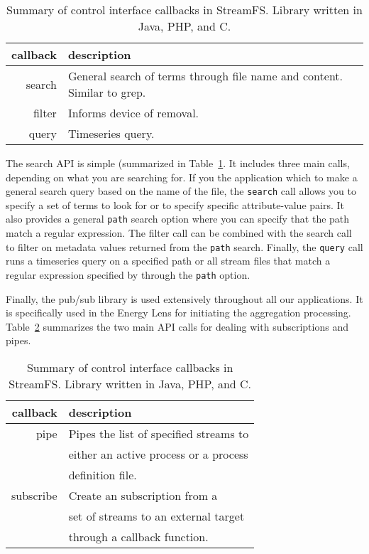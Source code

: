 \begin{table}[h]
\begin{center}
\begin{tabular}{| r | l |}
	\hline
	\textbf{callback} & \textbf{description} \\ \hline
	search & General search of terms through file name and content.  Similar to grep.    \\ \hline

	filter & Informs device of removal.    \\ \hline

	query & Timeseries query.    \\ \hline

\end{tabular}
\caption{Summary of control interface callbacks in StreamFS.  Library written in Java, PHP, and C.}
\label{tab:api_calls2}
\end{center}
\end{table}

The search API is simple (summarized in Table~\ref{tab:api_calls2}.  It includes three main calls, depending 
on what you are searching for.  If you the application 
which to make a general search query based on the name of the file, the \texttt{search} call allows you to specify 
a set of terms to look for or to specify specific attribute-value pairs.  It also provides a general 
\texttt{path} search option where you can specify that the path match a regular expression.
The filter call can be combined with the search call to filter on metadata values returned from the \texttt{path} search.
Finally, the \texttt{query} call runs a timeseries query on a specified path or all stream files
that match a regular expression specified by through the \texttt{path} option.

Finally, the pub/sub library is used extensively throughout all our applications.  It is specifically used in 
the Energy Lens for initiating the aggregation processing.  Table~\ref{tab:api_calls3} summarizes
the two main API calls for dealing with subscriptions and pipes.


\begin{table}[h]
\begin{center}
\begin{tabular}{| r | l |}
	\hline
	\textbf{callback} & \textbf{description} \\ \hline
	pipe & Pipes the list of specified streams to \\
		 & either an active process or a process \\
		 & definition file.    \\ \hline

	subscribe & Create an subscription from a 		 \\
			  & set of streams to an external target \\
			  & through a callback function. 		 \\ \hline

\end{tabular}
\caption{Summary of control interface callbacks in StreamFS.  Library written in Java, PHP, and C.}
\label{tab:api_calls3}
\end{center}
\end{table}

